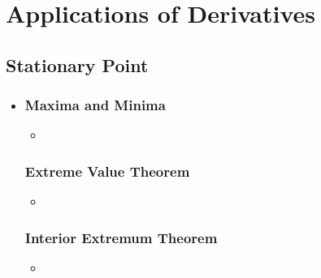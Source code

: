 \chapter{Applications of Derivatives}

\section{Stationary Point}
\begin{itemize}
  \item []
  
  \subsection{Maxima and Minima}
  \begin{itemize}
    \item 
  \end{itemize}

  \subsection{Extreme Value Theorem}
  \begin{itemize}
    \item 
  \end{itemize}

  \subsection{Interior Extremum Theorem}
  \begin{itemize}
    \item 
  \end{itemize}
  
  
\end{itemize}

